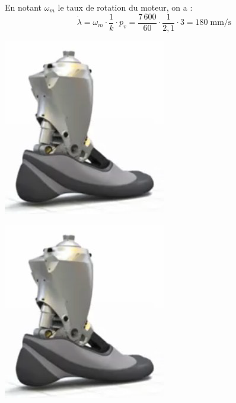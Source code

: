 \documentclass[10pt,fleqn]{article} %
\begin{document}
\ifprof
\begin{corrige}
En notant $\omega_m$ le taux de rotation du moteur, on a :
$$\dot{\lambda} = \omega_m \cdot \dfrac{1}{k}\cdot p_v  = 
 \dfrac{7\,600}{60} \cdot \dfrac{1}{2,1}\cdot 3=180 \; \text{mm/s}$$
 
 
\begin{center}
\includegraphics[width=.3\textwidth]{images/prot_01}
\end{center}
\end{corrige}
\else
\begin{minipage}[c]{.49\linewidth}
\begin{center}
\includegraphics[width=.9\textwidth]{images/prot_01}
\end{center}
\end{minipage} \hfill
\end{document}

